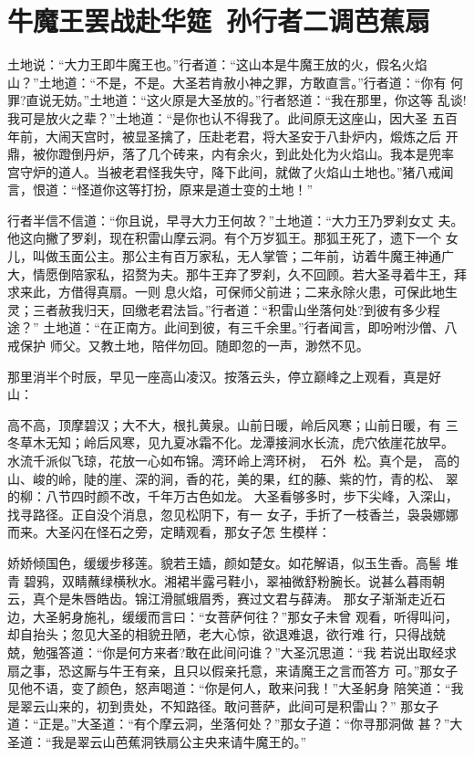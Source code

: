 \chapter{牛魔王罢战赴华筵~孙行者二调芭蕉扇}

土地说：“大力王即牛魔王也。”行者道：“这山本是牛魔王放的火，假名火焰
山？”土地道：“不是，不是。大圣若肯赦小神之罪，方敢直言。”行者道：“你有
何罪?直说无妨。”土地道：“这火原是大圣放的。”行者怒道：“我在那里，你这等
乱谈!我可是放火之辈？”土地道：“是你也认不得我了。此间原无这座山，因大圣
五百年前，大闹天宫时，被显圣擒了，压赴老君，将大圣安于八卦炉内，煅炼之后
开鼎，被你蹬倒丹炉，落了几个砖来，内有余火，到此处化为火焰山。我本是兜率
宫守炉的道人。当被老君怪我失守，降下此间，就做了火焰山土地也。”猪八戒闻
言，恨道：“怪道你这等打扮，原来是道士变的土地！”

行者半信不信道：“你且说，早寻大力王何故？”土地道：“大力王乃罗刹女丈
夫。他这向撇了罗刹，现在积雷山摩云洞。有个万岁狐王。那狐王死了，遗下一个
女儿，叫做玉面公主。那公主有百万家私，无人掌管；二年前，访着牛魔王神通广
大，情愿倒陪家私，招赘为夫。那牛王弃了罗刹，久不回顾。若大圣寻着牛王，拜
求来此，方借得真扇。一则息火焰，可保师父前进；二来永除火患，可保此地生
灵；三者赦我归天，回缴老君法旨。”行者道：“积雷山坐落何处?到彼有多少程途？”
土地道：“在正南方。此间到彼，有三千余里。”行者闻言，即吩咐沙僧、八戒保护
师父。又教土地，陪伴勿回。随即忽的一声，渺然不见。

那里消半个时辰，早见一座高山凌汉。按落云头，停立巅峰之上观看，真是好
山：

高不高，顶摩碧汉；大不大，根扎黄泉。山前日暖，岭后风寒；山前日暖，有
三冬草木无知；岭后风寒，见九夏冰霜不化。龙潭接涧水长流，虎穴依崖花放早。
水流千派似飞琼，花放一心如布锦。湾环岭上湾环树，石外松。真个是，
高的山、峻的岭，陡的崖、深的涧，香的花，美的果，红的藤、紫的竹，青的松、
翠的柳：八节四时颜不改，千年万古色如龙。
大圣看够多时，步下尖峰，入深山，找寻路径。正自没个消息，忽见松阴下，有一
女子，手折了一枝香兰，袅袅娜娜而来。大圣闪在怪石之旁，定睛观看，那女子怎
生模样：

娇娇倾国色，缓缓步移莲。貌若王嫱，颜如楚女。如花解语，似玉生香。高髻
堆青碧鸦，双睛蘸绿横秋水。湘裙半露弓鞋小，翠袖微舒粉腕长。说甚么暮雨朝
云，真个是朱唇皓齿。锦江滑腻蛾眉秀，赛过文君与薛涛。
那女子渐渐走近石边，大圣躬身施礼，缓缓而言曰：“女菩萨何往？”那女子未曾
观看，听得叫问，却自抬头；忽见大圣的相貌丑陋，老大心惊，欲退难退，欲行难
行，只得战兢兢，勉强答道：“你是何方来者?敢在此间问谁？”大圣沉思道：“我
若说出取经求扇之事，恐这厮与牛王有亲，且只以假亲托意，来请魔王之言而答方
可。”那女子见他不语，变了颜色，怒声喝道：“你是何人，敢来问我！”大圣躬身
陪笑道：“我是翠云山来的，初到贵处，不知路径。敢问菩萨，此间可是积雷山？”
那女子道：“正是。”大圣道：“有个摩云洞，坐落何处？”那女子道：“你寻那洞做
甚？”大圣道：“我是翠云山芭蕉洞铁扇公主央来请牛魔王的。”

